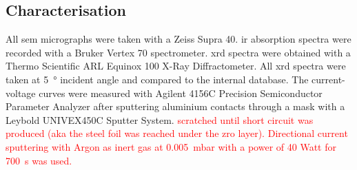\documentclass[a4paper]{article}
\newcommand{\td}[1]{\textcolor{red}{#1}}
\begin{document}
\subsection{Characterisation}
All \gls{sem} micrographs were taken with a Zeiss Supra 40. 
\Gls{ir} absorption spectra were recorded with a Bruker Vertex 70 spectrometer.
\Gls{xrd} spectra were obtained with a Thermo Scientific ARL Equinox 100 X-Ray Diffractometer. 
All \gls{xrd} spectra were taken at \SI{5}{\degree} incident angle and compared to the internal database.
The current-voltage curves were measured with Agilent 4156C Precision Semiconductor Parameter Analyzer after sputtering aluminium contacts through a mask with a Leybold UNIVEX450C Sputter System.
\td{scratched until short circuit was produced (aka the steel foil was reached under the \gls{zro} layer).  }
\td{Directional current sputtering with Argon as inert gas at \SI{0.005}{\milli\bar} with a power of 40 Watt for \SI{700}{\second} was used.}
\end{document}
